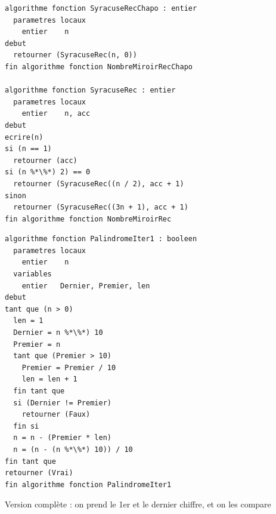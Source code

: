 \documentclass[11pt,a4paper]{article}
\begin{document}
\begin{table}[ht!]
  \centering
\begin{lstlisting}[style=algorithmique]
algorithme fonction SyracuseRecChapo : entier
  parametres locaux
    entier    n
debut
  retourner (SyracuseRec(n, 0))
fin algorithme fonction NombreMiroirRecChapo

algorithme fonction SyracuseRec : entier
  parametres locaux
    entier    n, acc
debut
ecrire(n)
si (n == 1)
  retourner (acc)
si (n %*\%*) 2) == 0
  retourner (SyracuseRec((n / 2), acc + 1)
sinon
  retourner (SyracuseRec((3n + 1), acc + 1)
fin algorithme fonction NombreMiroirRec \end{lstlisting}
\end{table}

\bigskip

\newpage


\begin{table}[ht!]
  \centering
\begin{lstlisting}[style=algorithmique]
algorithme fonction PalindromeIter1 : booleen
  parametres locaux
    entier    n
  variables
    entier   Dernier, Premier, len
debut
tant que (n > 0)
  len = 1
  Dernier = n %*\%*) 10
  Premier = n
  tant que (Premier > 10)
    Premier = Premier / 10
    len = len + 1
  fin tant que
  si (Dernier != Premier)
    retourner (Faux)
  fin si
  n = n - (Premier * len)
  n = (n - (n %*\%*) 10)) / 10
fin tant que
retourner (Vrai)
fin algorithme fonction PalindromeIter1 \end{lstlisting}
  \caption{Version complète : on prend le 1er et le dernier chiffre, et on les compare}
\end{table}
\end{document}
